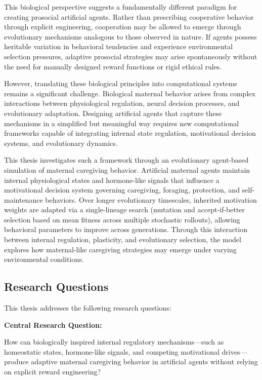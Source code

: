 This biological perspective suggests a fundamentally different paradigm for creating prosocial artificial agents. Rather than prescribing cooperative behavior through explicit engineering, cooperation may be allowed to emerge through evolutionary mechanisms analogous to those observed in nature. If agents possess heritable variation in behavioral tendencies and experience environmental selection pressures, adaptive prosocial strategies may arise spontaneously without the need for manually designed reward functions or rigid ethical rules.

However, translating these biological principles into computational systems remains a significant challenge. Biological maternal behavior arises from complex interactions between physiological regulation, neural decision processes, and evolutionary adaptation. Designing artificial agents that capture these mechanisms in a simplified but meaningful way requires new computational frameworks capable of integrating internal state regulation, motivational decision systems, and evolutionary dynamics.

This thesis investigates such a framework through an evolutionary agent-based simulation of maternal caregiving behavior. Artificial maternal agents maintain internal physiological states and hormone-like signals that influence a motivational decision system governing caregiving, foraging, protection, and self-maintenance behaviors. Over longer evolutionary timescales, inherited motivation weights are adapted via a single-lineage search (mutation and accept-if-better selection based on mean fitness across multiple stochastic rollouts), allowing behavioral parameters to improve across generations. Through this interaction between internal regulation, plasticity, and evolutionary selection, the model explores how maternal-like caregiving strategies may emerge under varying environmental conditions.

\subsection{Research Questions}

This thesis addresses the following research questions:

\textbf{Central Research Question:}

How can biologically inspired internal regulatory mechanisms—such as homeostatic states, hormone-like signals, and competing motivational drives—produce adaptive maternal caregiving behavior in artificial agents without relying on explicit reward engineering?

